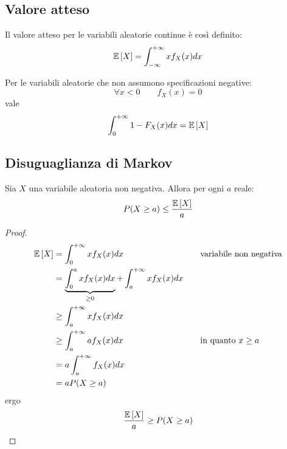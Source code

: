 \subsection{Valore atteso}
\begin{defin}
	Il valore atteso per le variabili aleatorie continue è così definito:
	\begin{equation*}
		\mathbb{E}\left[ X \right]=\int_{-\infty}^{+\infty} x f_X(x)dx
	\end{equation*}
\end{defin}

\begin{prop} \label{prop:valatnonneg}
	Per le variabili aleatorie che non assumono specificazioni negative:
	\begin{equation*}
		\forall x<0 \qquad f_X(x)=0
	\end{equation*}
	vale
	\begin{equation*}
		\int_0^{+\infty} 1-F_X(x)dx = \mathbb{E}\left[ X \right]
	\end{equation*}
\end{prop}

\subsection{Disuguaglianza di Markov}
\begin{teor} \label{teor:markov}
	Sia $X$ una variabile aleatoria non negativa. Allora per ogni $a$ reale:
	\begin{equation*}
		P(X\geq a) \leq \frac{\mathbb{E}\left[ X \right]}{a}
	\end{equation*}
\end{teor}
\begin{proof}
	\begin{align*}
		\mathbb{E}\left[ X \right] & = \int_0^{+\infty} x f_X(x) dx                  & \quad & \text{variabile non negativa} \\
		       & = \underbrace{\int_0^a x f_X(x) dx}_{\geq 0} + \int_a^{+\infty} x f_X(x) dx \\
		       & \geq \int_a^{+\infty} x f_X(x) dx                                           \\
		       & \geq \int_a^{+\infty} a f_X(x) dx                  & \quad & \text{in quanto $x\geq a$} \\
		       & = a \int_a^{+\infty} f_X(x) dx                                              \\
		       & = a P(X\geq a)
	\end{align*}
	ergo
	\begin{equation*}
		\frac{\mathbb{E}\left[ X \right]}{a}\geq P(X\geq a)
	\end{equation*}
\end{proof}



